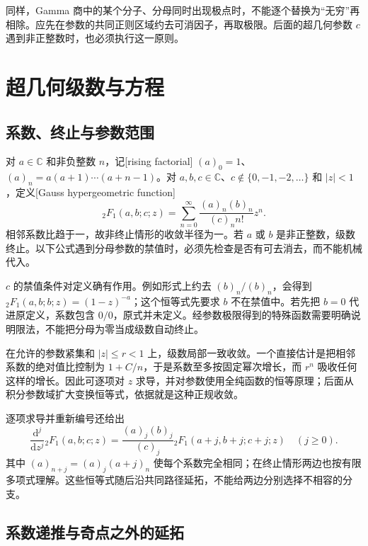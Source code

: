 同样，Gamma 商中的某个分子、分母同时出现极点时，不能逐个替换为“无穷”再相除。应先在参数的共同正则区域约去可消因子，再取极限。后面的超几何参数 \(c\) 遇到非正整数时，也必须执行这一原则。

\section{超几何级数与方程}
\label{b3:sec:F02}

\subsection{系数、终止与参数范围}
\label{b3:subsec:F0201}

对 \(a\in\mathbb C\) 和非负整数 \(n\)，记[rising factorial] \((a)_0=1\)、\((a)_n=a(a+1)\cdots(a+n-1)\)。对 \(a,b,c\in\mathbb C\)、\(c\notin\{0,-1,-2,\ldots\}\) 和 \(|z|<1\)，定义[Gauss hypergeometric function]
\[
 {}_2F_1(a,b;c;z)=\sum_{n=0}^\infty\frac{(a)_n(b)_n}{(c)_n n!}z^n.
\]
相邻系数比趋于一，故非终止情形的收敛半径为一。若 \(a\) 或 \(b\) 是非正整数，级数终止。以下公式遇到分母参数的禁值时，必须先检查是否有可去消去，而不能机械代入。

\(c\) 的禁值条件对定义确有作用。例如形式上约去 \((b)_n/(b)_n\)，会得到 \({}_2F_1(a,b;b;z)=(1-z)^{-a}\)；这个恒等式先要求 \(b\) 不在禁值中。若先把 \(b=0\) 代进原定义，系数包含 \(0/0\)，原式并未定义。经参数极限得到的特殊函数需要明确说明限法，不能把分母为零当成级数自动终止。

在允许的参数紧集和 \(|z|\le r<1\) 上，级数局部一致收敛。一个直接估计是把相邻系数的绝对值比控制为 \(1+C/n\)，于是系数至多按固定幂次增长，而 \(r^n\) 吸收任何这样的增长。因此可逐项对 \(z\) 求导，并对参数使用全纯函数的恒等原理；后面从积分参数域扩大变换恒等式，依据就是这种正规收敛。

逐项求导并重新编号还给出
\[
 \frac{\mathrm{d}^j}{\mathrm{d}z^j}{}_2F_1(a,b;c;z)
 =\frac{(a)_j(b)_j}{(c)_j}{}_2F_1(a+j,b+j;c+j;z)
 \quad(j\ge0).
\]
其中 \((a)_{n+j}=(a)_j(a+j)_n\) 使每个系数完全相同；在终止情形两边也按有限多项式理解。这些恒等式随后沿共同路径延拓，不能给两边分别选择不相容的分支。

\subsection{系数递推与奇点之外的延拓}
\label{b3:subsec:F0202}

